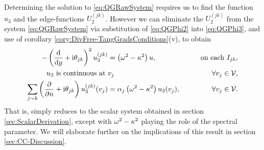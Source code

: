 Determining the solution to \eqref{eq:QGRawSystem} requires us to find the function $u_3$ and the edge-functions $U_2^{(jk)}$.
However we can eliminate the $U_2^{(jk)}$ from the system \eqref{eq:QGRawSystem} via substitution of \eqref{eq:QGPhi2} into \eqref{eq:QGPhi3}, and use of corollary \ref{cory:DivFree-TangGradsConditions}(v), to obtain
\begin{subequations} \label{eq:CurlCurl-ScalarQGProblem}
	\begin{align}
		-\left(  \dfrac{\mathrm{d}}{\mathrm{d}y} + \mathrm{i}\theta_{jk}  \right)^2 u_3^{(jk)} &= \left( \omega^2-\kappa^2 \right)u,
		\qquad &\text{on each } I_{jk}, \\
		u_3 \text{ is continuous at } & v_j \qquad &\forall v_j\in\mathcal{V}, \\
		\sum_{j\sim k}\left( \dfrac{\partial }{\partial n}+\mathrm{i}\theta_{jk} \right)u_3^{(jk)}(v_j) &= \alpha_j\left( \omega^2-\kappa^2 \right)u_3(v_j), \qquad &\forall v_j\in\mathcal{V}.
	\end{align}
\end{subequations}
That is,  simply reduces to the scalar system obtained in section \ref{sec:ScalarDerivation}, except with $\omega^2-\kappa^2$ playing the role of the spectral parameter.
We will elaborate further on the implications of this result in section \ref{sec:CC-Discussion}.


